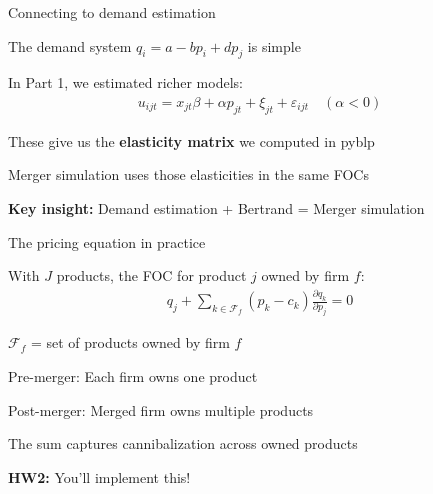 \documentclass[notes,11pt, aspectratio=169]{beamer}
\newenvironment{wideitemize}{\itemize\addtolength{\itemsep}{10pt}}{\enditemize}
\begin{document}
\begin{frame}{Connecting to demand estimation}
	\begin{wideitemize}
		\item The demand system $q_i = a - bp_i + dp_j$ is simple
		\item In Part 1, we estimated richer models:
		\begin{align*}
			u_{ijt} = x_{jt}\beta + \alpha p_{jt} + \xi_{jt} + \varepsilon_{ijt} \quad (\alpha < 0)
		\end{align*}
		\item These give us the \textbf{elasticity matrix} we computed in pyblp
		\item Merger simulation uses those elasticities in the same FOCs
		\item \textbf{Key insight:} Demand estimation + Bertrand = Merger simulation
	\end{wideitemize}
\end{frame}

\begin{frame}{The pricing equation in practice}
	\begin{wideitemize}
		\item With $J$ products, the FOC for product $j$ owned by firm $f$:
		\begin{align*}
			q_j + \sum_{k \in \mathcal{F}_f} (p_k - c_k) \frac{\partial q_k}{\partial p_j} = 0
		\end{align*}
		\item $\mathcal{F}_f$ = set of products owned by firm $f$
		\item Pre-merger: Each firm owns one product
		\item Post-merger: Merged firm owns multiple products
		\item The sum captures cannibalization across owned products
		\item \textbf{HW2:} You'll implement this!
	\end{wideitemize}
\end{frame}
\end{document}
